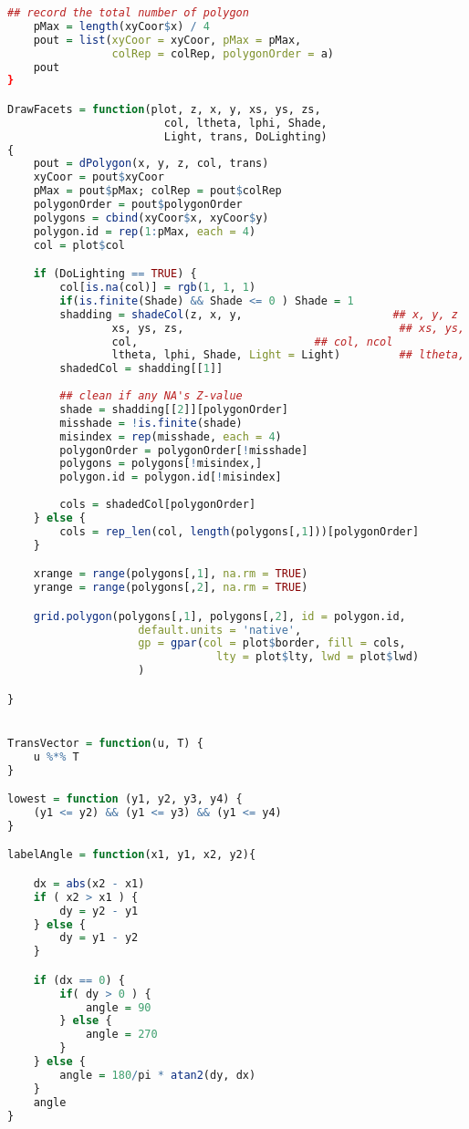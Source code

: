 \begin{lstlisting}[language = R]
    ## record the total number of polygon
    pMax = length(xyCoor$x) / 4
    pout = list(xyCoor = xyCoor, pMax = pMax, 
                colRep = colRep, polygonOrder = a)
    pout
}

DrawFacets = function(plot, z, x, y, xs, ys, zs, 
                        col, ltheta, lphi, Shade,
                        Light, trans, DoLighting)
{
    pout = dPolygon(x, y, z, col, trans)
    xyCoor = pout$xyCoor
    pMax = pout$pMax; colRep = pout$colRep
    polygonOrder = pout$polygonOrder
    polygons = cbind(xyCoor$x, xyCoor$y)
    polygon.id = rep(1:pMax, each = 4)
    col = plot$col

    if (DoLighting == TRUE) {
        col[is.na(col)] = rgb(1, 1, 1)
        if(is.finite(Shade) && Shade <= 0 ) Shade = 1
        shadding = shadeCol(z, x, y,                       ## x, y, z
                xs, ys, zs,                                 ## xs, ys, zs 
                col,                           ## col, ncol
                ltheta, lphi, Shade, Light = Light)         ## ltheta, lphi, Shade(not shade)
        shadedCol = shadding[[1]]
        
        ## clean if any NA's Z-value
        shade = shadding[[2]][polygonOrder]
        misshade = !is.finite(shade)
        misindex = rep(misshade, each = 4)
        polygonOrder = polygonOrder[!misshade]
        polygons = polygons[!misindex,]
        polygon.id = polygon.id[!misindex]
        
        cols = shadedCol[polygonOrder]        
    } else {
        cols = rep_len(col, length(polygons[,1]))[polygonOrder]
    }

    xrange = range(polygons[,1], na.rm = TRUE)
    yrange = range(polygons[,2], na.rm = TRUE)

    grid.polygon(polygons[,1], polygons[,2], id = polygon.id,
                    default.units = 'native', 
                    gp = gpar(col = plot$border, fill = cols, 
                                lty = plot$lty, lwd = plot$lwd)
                    )

}


TransVector = function(u, T) {
    u %*% T
}

lowest = function (y1, y2, y3, y4) {
    (y1 <= y2) && (y1 <= y3) && (y1 <= y4)		
}

labelAngle = function(x1, y1, x2, y2){  

    dx = abs(x2 - x1)
    if ( x2 > x1 ) {
        dy = y2 - y1
    } else {
        dy = y1 - y2
    }

    if (dx == 0) {
        if( dy > 0 ) {
            angle = 90
        } else {
            angle = 270
        }
    } else {
        angle = 180/pi * atan2(dy, dx)
    }
    angle
}	


\end{lstlisting}
